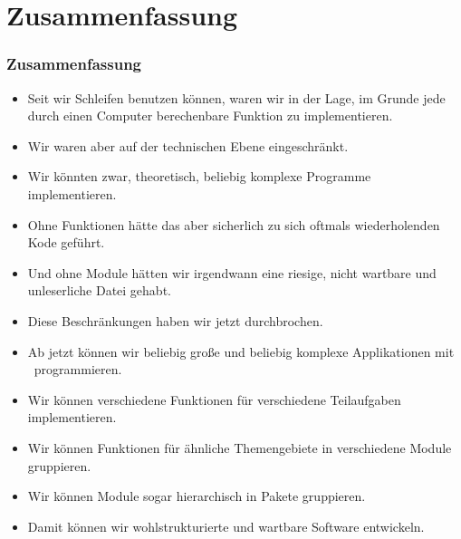 \documentclass[aspectratio=169,mathserif,notheorems]{beamer}%
\begin{document}
\section{Zusammenfassung}%
%
\begin{frame}%
\frametitle{Zusammenfassung}%
\begin{itemize}%
%
\item Seit wir Schleifen benutzen können, waren wir in der Lage, im Grunde jede durch einen Computer berechenbare Funktion zu implementieren.%
%
\item<2-> Wir waren aber auf der technischen Ebene eingeschränkt.
%
\item<3-> Wir könnten zwar, theoretisch, beliebig komplexe Programme implementieren.%
%
\item<4-> Ohne Funktionen hätte das aber sicherlich zu sich oftmals wiederholenden Kode geführt.%
%
\item<5-> Und ohne Module hätten wir irgendwann eine riesige, nicht wartbare und unleserliche Datei gehabt.%
%
\item<6-> Diese Beschränkungen haben wir jetzt durchbrochen.%
%
\item<7-> Ab jetzt können wir beliebig große und beliebig komplexe Applikationen mit \python\ programmieren.%
%
\item<8-> Wir können verschiedene Funktionen für verschiedene Teilaufgaben implementieren.%
%
\item<9-> Wir können Funktionen für ähnliche Themengebiete in verschiedene Module gruppieren.%
%
\item<10-> Wir können Module sogar hierarchisch in Pakete gruppieren.%
%
\item<11-> Damit können wir wohlstrukturierte und wartbare Software entwickeln.%
\end{itemize}%
\end{frame}%
%
\endPresentation%
\end{document}
